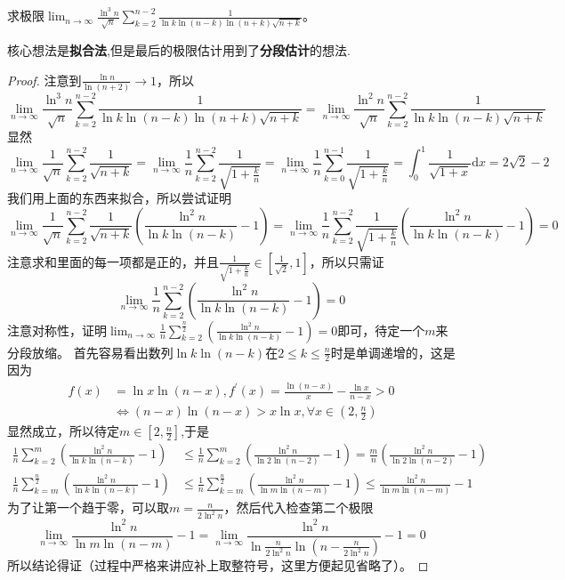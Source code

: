 \documentclass[../../main.tex]{subfiles}%
\begin{document}
\begin{example}
求极限\(\lim_{n\rightarrow\infty}\frac{\ln^3n}{\sqrt{n}}\sum_{k = 2}^{n - 2}\frac{1}{\ln k\ln(n - k)\ln(n + k)\sqrt{n + k}}\)。
\end{example}
\begin{note}
核心想法是\textbf{拟合法},但是最后的极限估计用到了\textbf{分段估计}的想法.
\end{note}
\begin{proof}

注意到\(\frac{\ln n}{\ln(n+2)}\to1\)，所以
\[
\lim_{n\rightarrow\infty}\frac{\ln^3n}{\sqrt{n}}\sum_{k = 2}^{n - 2}\frac{1}{\ln k\ln(n - k)\ln(n + k)\sqrt{n + k}}=\lim_{n\rightarrow\infty}\frac{\ln^2n}{\sqrt{n}}\sum_{k = 2}^{n - 2}\frac{1}{\ln k\ln(n - k)\sqrt{n + k}}
\]
显然
\[
\lim_{n\rightarrow\infty}\frac{1}{\sqrt{n}}\sum_{k = 2}^{n - 2}\frac{1}{\sqrt{n + k}}=\lim_{n\rightarrow\infty}\frac{1}{n}\sum_{k = 2}^{n - 2}\frac{1}{\sqrt{1+\frac{k}{n}}}=\lim_{n\rightarrow\infty}\frac{1}{n}\sum_{k = 0}^{n - 1}\frac{1}{\sqrt{1+\frac{k}{n}}}=\int_{0}^{1}\frac{1}{\sqrt{1 + x}}\mathrm{d}x=2\sqrt{2}-2
\]
我们用上面的东西来拟合，所以尝试证明
\[
\lim_{n\rightarrow\infty}\frac{1}{\sqrt{n}}\sum_{k = 2}^{n - 2}\frac{1}{\sqrt{n + k}}\left(\frac{\ln^2n}{\ln k\ln(n - k)}-1\right)=\lim_{n\rightarrow\infty}\frac{1}{n}\sum_{k = 2}^{n - 2}\frac{1}{\sqrt{1+\frac{k}{n}}}\left(\frac{\ln^2n}{\ln k\ln(n - k)}-1\right)=0
\]
注意求和里面的每一项都是正的，并且\(\frac{1}{\sqrt{1+\frac{k}{n}}}\in\left[\frac{1}{\sqrt{2}},1\right]\)，所以只需证
\[
\lim_{n\rightarrow\infty}\frac{1}{n}\sum_{k = 2}^{n - 2}\left(\frac{\ln^2n}{\ln k\ln(n - k)}-1\right)=0
\]
注意对称性，证明\(\lim_{n\rightarrow\infty}\frac{1}{n}\sum_{k = 2}^{\frac{n}{2}}\left(\frac{\ln^2n}{\ln k\ln(n - k)}-1\right)=0\)即可，待定一个\(m\)来分段放缩。
首先容易看出数列\(\ln k\ln(n - k)\)在\(2\leqslant  k\leqslant \frac{n}{2}\)时是单调递增的，这是因为
\begin{align*}
f(x)&=\ln x\ln(n - x),f^\prime(x)=\frac{\ln(n - x)}{x}-\frac{\ln x}{n - x}>0\\
&\Leftrightarrow(n - x)\ln(n - x)>x\ln x,\forall x\in\left(2,\frac{n}{2}\right)
\end{align*}
显然成立，所以待定$m\in[2,\frac{n}{2}]$,于是
\begin{align*}
\frac{1}{n}\sum_{k = 2}^{m}\left(\frac{\ln^2n}{\ln k\ln(n - k)}-1\right)&\leqslant \frac{1}{n}\sum_{k = 2}^{m}\left(\frac{\ln^2n}{\ln 2\ln(n - 2)}-1\right)=\frac{m}{n}\left(\frac{\ln^2n}{\ln 2\ln(n - 2)}-1\right)\\
\frac{1}{n}\sum_{k = m}^{\frac{n}{2}}\left(\frac{\ln^2n}{\ln k\ln(n - k)}-1\right)&\leqslant \frac{1}{n}\sum_{k = m}^{\frac{n}{2}}\left(\frac{\ln^2n}{\ln m\ln(n - m)}-1\right)\leqslant \frac{\ln^2n}{\ln m\ln(n - m)}-1
\end{align*}
为了让第一个趋于零，可以取\(m = \frac{n}{2\ln^2n}\)，然后代入检查第二个极限
\[
\lim_{n\rightarrow\infty}\frac{\ln^2n}{\ln m\ln(n - m)}-1=\lim_{n\rightarrow\infty}\frac{\ln^2n}{\ln\frac{n}{2\ln^2n}\ln\left(n-\frac{n}{2\ln^2n}\right)}-1 = 0
\]
所以结论得证（过程中严格来讲应补上取整符号，这里方便起见省略了）。

\end{proof}
\end{document}
